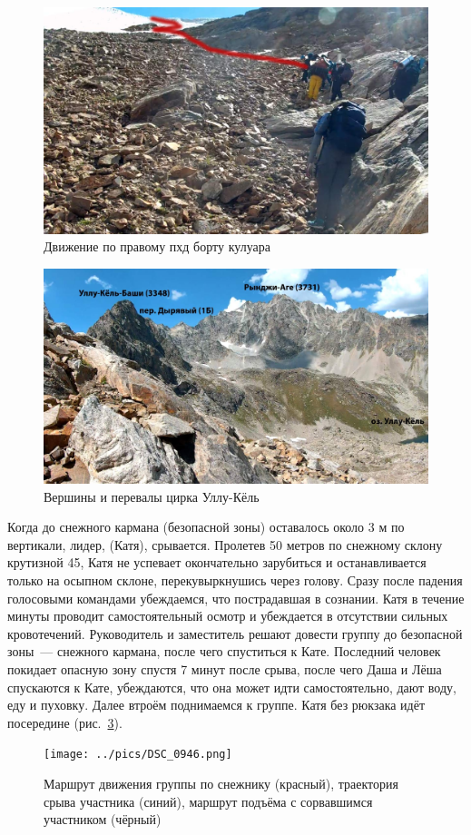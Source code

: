 \begin{figure}[h!]
	\centering
	\includegraphics[width=0.7\linewidth]{../pics/20aug3.jpg}
	\caption{Движение по правому пхд борту кулуара}
	\label{fig:20aug3.jpg}
\end{figure}

\begin{figure}[h!]
	\centering
	\includegraphics[width=0.7\linewidth]{../pics/20aug4.jpg}
	\caption{Вершины и перевалы цирка Уллу-Кёль}
	\label{fig:20aug4.jpg}
\end{figure}

Когда до снежного кармана (безопасной зоны) оставалось около 3 м по вертикали, лидер, (Катя), срывается. Пролетев 50 метров по снежному склону крутизной 45\degree, Катя не успевает окончательно зарубиться и останавливается только на осыпном склоне, перекувыркнушись через голову. Сразу после падения голосовыми командами убеждаемся, что пострадавшая в сознании. Катя в течение минуты проводит самостоятельный осмотр и убеждается в отсутствии сильных кровотечений. Руководитель и заместитель решают довести группу до безопасной зоны~--- снежного кармана, после чего спуститься к Кате. Последний человек покидает опасную зону спустя 7 минут после срыва, после чего Даша и Лёша спускаются к Кате, убеждаются, что она может идти самостоятельно, дают воду, еду и пуховку. Далее втроём поднимаемся к группе. Катя без рюкзака идёт посередине (рис.~\ref{fig:DSC_0946}).


\begin{figure}[h!]
	\centering
	\texttt{[image: ../pics/DSC\_0946.png]}
	\caption{Маршрут движения группы по снежнику (красный), траектория срыва участника (синий), маршрут подъёма с сорвавшимся участником (чёрный)}
	\label{fig:DSC_0946}
\end{figure}

